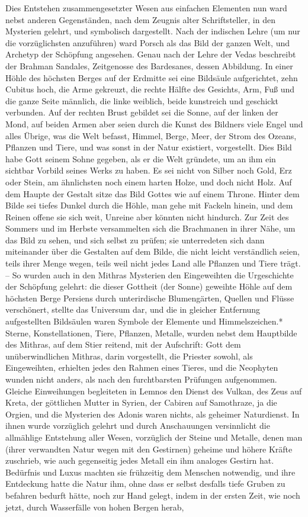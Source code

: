 \documentclass[a4paper, 11pt, oneside, polutonikogreek, german]{article}
\begin{document}
Dies Entstehen zusammengesetzter Wesen aus einfachen Elementen nun ward nebst anderen Gegenständen, nach dem Zeugnis alter Schriftsteller, in den Mysterien gelehrt, und symbolisch dargestellt. Nach der indischen Lehre (um nur die vorzüglichsten anzuführen) ward Porsch als das Bild der ganzen Welt, und Archetyp der Schöpfung angesehen. Genau nach der Lehre der Vedas beschreibt der Brahman Sandales, Zeitgenosse des Bardesanes, dessen Abbildung. In einer Höhle des höchsten Berges auf der Erdmitte sei eine Bildsäule aufgerichtet, zehn Cubitus hoch, die Arme gekreuzt, die rechte Hälfte des Gesichts, Arm, Fuß und die ganze Seite männlich, die linke weiblich, beide kunstreich und geschickt verbunden. Auf der rechten Brust gebildet sei die Sonne, auf der linken der Mond, auf beiden Armen aber seien durch die Kunst des Bildners viele Engel und alles Übrige, was die Welt befasst, Himmel, Berge, Meer, der Strom des Ozeans, Pflanzen und Tiere, und was sonst in der Natur existiert, vorgestellt. Dies Bild habe Gott seinem Sohne gegeben, als er die Welt gründete, um an ihm ein sichtbar Vorbild seines Werks zu haben. Es sei nicht von Silber noch Gold, Erz oder Stein, am ähnlichsten noch einem harten Holze, und doch nicht Holz. Auf dem Haupte der Gestalt sitze das Bild Gottes wie auf einem Throne. Hinter dem Bilde sei tiefes Dunkel durch die Höhle, man gehe mit Fackeln hinein, und dem Reinen offene sie sich weit, Unreine aber könnten nicht hindurch. Zur Zeit des Sommers und im Herbste versammelten sich die Brachmanen in ihrer Nähe, um das Bild zu sehen, und sich selbst zu prüfen; sie unterredeten sich dann miteinander über die Gestalten auf dem Bilde, die nicht leicht verständlich seien, teils ihrer Menge wegen, teils weil nicht jedes Land alle Pflanzen und Tiere trägt. -- So wurden auch in den Mithras Mysterien den Eingeweihten die Urgeschichte der Schöpfung gelehrt: die dieser Gottheit (der Sonne) geweihte Höhle auf dem höchsten Berge Persiens durch unterirdische Blumengärten, Quellen und Flüsse verschönert, stellte das Universum dar, und die in gleicher Entfernung aufgestellten Bildsäulen waren Symbole der Elemente und Himmelszeichen.* Sterne, Konstellationen, Tiere, Pflanzen, Metalle, wurden nebst dem Hauptbilde des Mithras, auf dem Stier reitend, mit der Aufschrift: Gott dem unüberwindlichen Mithras, darin vorgestellt, die Priester sowohl, als Eingeweihten, erhielten jedes den Rahmen eines Tieres, und die Neophyten wunden nicht anders, als nach den furchtbarsten Prüfungen aufgenommen. Gleiche Einweihungen begleiteten in Lemnos den Dienst des Vulkan, des Zeus auf Kreta, der göttlichen Mutter in Syrien, der Cabiren auf Samothraze, ja die Orgien, und die Mysterien des Adonis waren nichts, als geheimer Naturdienst. In ihnen wurde vorzüglich gelehrt und durch Anschauungen versinnlicht die allmählige Entstehung aller Wesen, vorzüglich der Steine und Metalle, denen man (ihrer verwandten Natur wegen mit den Gestirnen) geheime und höhere Kräfte zuschrieb, wie auch gegenseitig jedes Metall ein ihm analoges Gestirn hat. Bedürfnis und Luxus machten sie frühzeitig dem Menschen notwendig, und ihre Entdeckung hatte die Natur ihm, ohne dass er selbst desfalls tiefe Gruben zu befahren bedurft hätte, noch zur Hand gelegt, indem in der ersten Zeit, wie noch jetzt, durch Wasserfälle von hohen Bergen herab, 
\end{document}
